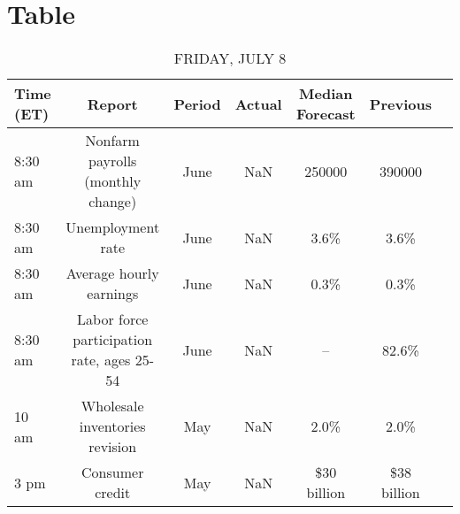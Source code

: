 \documentclass{article}%
\begin{document}
%
\section{Table}%
\label{sec:Table}%


\begin{table}[htbp]%
\caption{FRIDAY, JULY 8}%
\centering%
\begin{adjustbox}{width=1\textwidth}%
\begin{tabular}{lcccccc}
\toprule
Time (ET) &                                     Report & Period & Actual & Median Forecast &    Previous \\
\midrule
  8:30 am &          Nonfarm payrolls (monthly change) &   June &    NaN &          250000 &      390000 \\
  8:30 am &                          Unemployment rate &   June &    NaN &            3.6\% &        3.6\% \\
  8:30 am &                    Average hourly earnings &   June &    NaN &            0.3\% &        0.3\% \\
  8:30 am & Labor force participation rate, ages 25-54 &   June &    NaN &              -- &       82.6\% \\
    10 am &             Wholesale inventories revision &    May &    NaN &            2.0\% &        2.0\% \\
     3 pm &                            Consumer credit &    May &    NaN &     \$30 billion & \$38 billion \\
\bottomrule
\end{tabular}
%
\end{adjustbox}%
\end{table}

%
\end{document}
